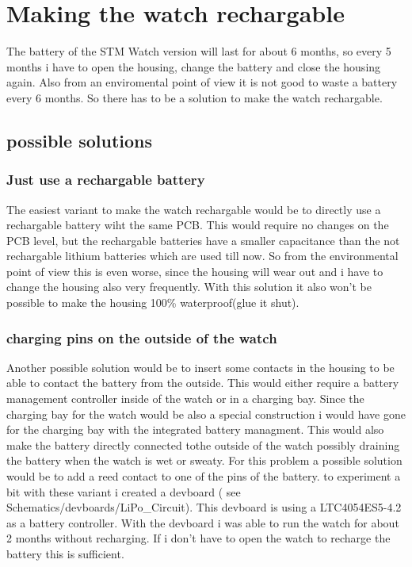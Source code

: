 \section{Making the watch rechargable}
The battery of the STM Watch version will last for about 6 months, so every 5 months i have to open the housing, change the battery and close the housing again. Also from an enviromental point of view it is not good to waste a battery every 6 months. So there has to be a solution to make the watch rechargable.
\subsection{possible solutions}
\subsubsection{Just use a rechargable battery}
The easiest variant to make the watch rechargable would be to directly use a rechargable battery wiht the same PCB. This would require no changes on the PCB level, but the rechargable batteries have a smaller capacitance than the not rechargable lithium batteries which are used till now.
So from the environmental point of view this is even worse, since the housing will wear out and i have to change the housing also very frequently. With this solution it also won't be possible to make the housing 100\% waterproof(glue it shut).
\subsubsection{charging pins on the outside of the watch}
Another possible solution would be to insert some contacts in the housing to be able to contact the battery from the outside. This would either require a battery management controller inside of the watch or in a charging bay. Since the charging bay for the watch would be also a special construction i would have gone for the charging bay with the integrated battery managment. 
This would also make the battery directly connected tothe outside of the watch possibly draining the battery when the watch is wet or sweaty.
For this problem a possible solution would be to add a reed contact to one of the pins of the battery.
to experiment a bit with these variant i created a devboard ( see Schematics/devboards/LiPo\_Circuit). This devboard is using a LTC4054ES5-4.2 as a battery controller.
With the devboard i was able to run the watch for about 2 months without recharging. If i don't have to open the watch to recharge the battery this is sufficient.
